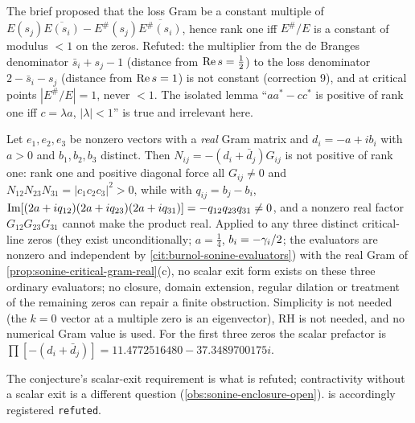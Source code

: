 \begin{observation}
\label{obs:sonine-numerator-test-refuted}
The brief proposed that the loss Gram be a constant multiple of $E(s_j)\overline{E(s_i)}-E^\#(s_j)\overline{E^\#(s_i)}$, hence
rank one iff $E^\#/E$ is a constant of modulus $<1$ on the zeros. Refuted: the multiplier from the de Branges denominator
$\bar s_i+s_j-1$ (distance from $\operatorname{Re} s = \tfrac12$) to the loss denominator $2-\bar s_i-s_j$ (distance from $\operatorname{Re} s = 1$)
is not constant (correction 9), and at critical points $|E^\#/E| = 1$, never $<1$. The isolated lemma ``$aa^{*}-cc^{*}$ is
positive of rank one iff $c = \lambda a$, $|\lambda|<1$'' is true and irrelevant here.
\end{observation}

\begin{theorem}
\label{thm:h-theta-1-refuted}
Let $e_1,e_2,e_3$ be nonzero vectors with a \emph{real} Gram matrix and $d_i = -a+ib_i$ with $a>0$ and $b_1,b_2,b_3$
distinct. Then $N_{ij} = -(d_i+\bar d_j)G_{ij}$ is not positive of rank one: rank one and positive diagonal force all
$G_{ij}\ne0$ and $N_{12}N_{23}N_{31} = |c_1c_2c_3|^2>0$, while with $q_{ij} = b_j-b_i$,
$\operatorname{Im}[(2a+iq_{12})(2a+iq_{23})(2a+iq_{31})] = -q_{12}q_{23}q_{31}\ne0$, and a nonzero real factor $G_{12}G_{23}G_{31}$ cannot make
the product real. Applied to any three distinct critical-line zeros (they exist unconditionally; $a = \tfrac14$,
$b_i = -\gamma_{i}/2$; the evaluators are nonzero and independent by \cref{cit:burnol-sonine-evaluators}) with the real Gram of
\cref{prop:sonine-critical-gram-real}(c), no scalar exit form exists on these three ordinary evaluators; no closure,
domain extension, regular dilation or treatment of the remaining zeros can repair a finite obstruction. Simplicity is
not needed (the $k = 0$ vector at a multiple zero is an eigenvector), RH is not needed, and no numerical Gram value is
used. For the first three zeros the scalar prefactor is $\prod[-(d_i+\bar d_j)] = 11.4772516480-37.3489700175i$.
\end{theorem}

The conjecture's scalar-exit requirement is what is refuted; contractivity without a scalar exit is a different
question (\cref{obs:sonine-enclosure-open}).  is accordingly registered \texttt{refuted}.

